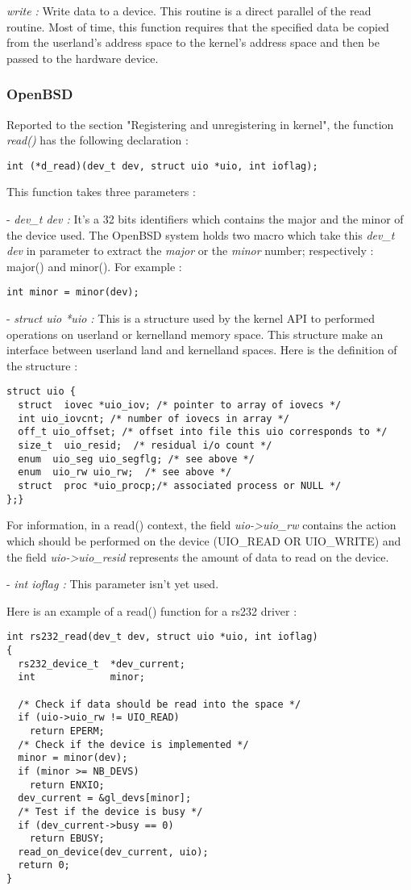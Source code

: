 \documentclass[11pt]{report}
\begin{document}
{\it write :} Write data to a device. This routine is a direct parallel of the read
routine. Most of time, this function requires that the specified data be copied from
the userland's address space to the kernel's address space and then be passed to the
hardware device.

\subsubsection{OpenBSD}
Reported to the section "Registering and unregistering in kernel", the function {\it read()}
has the following declaration :
\begin{lstlisting}
int (*d_read)(dev_t dev, struct uio *uio, int ioflag);
\end{lstlisting}
This function takes three parameters :
\begin{description}
  \item{- {\it dev\_t dev :} It's a 32 bits identifiers which contains the major and the
  minor of the device used. The OpenBSD system holds two macro which take this
  {\it dev\_t dev} in parameter to extract the {\it major} or the {\it minor} number;
  respectively : major() and minor(). For example :
  \begin{lstlisting}
int minor = minor(dev);
  \end{lstlisting}
  }
  \item{- {\it struct uio *uio :} This is a structure used by the kernel API to performed
  operations on userland or kernelland memory space. This structure make an interface
  between userland land and kernelland spaces. Here is the definition of the structure :
  \begin{lstlisting}
struct uio {
  struct  iovec *uio_iov; /* pointer to array of iovecs */
  int uio_iovcnt; /* number of iovecs in array */
  off_t uio_offset; /* offset into file this uio corresponds to */
  size_t  uio_resid;  /* residual i/o count */
  enum  uio_seg uio_segflg; /* see above */
  enum  uio_rw uio_rw;  /* see above */
  struct  proc *uio_procp;/* associated process or NULL */
};}
  \end{lstlisting}
  For information, in a read() context, the field {\it uio-\textgreater uio\_rw} contains
the action which should be performed on the device (UIO\_READ OR UIO\_WRITE) and the field
{\it uio-\textgreater uio\_resid} represents the amount of data to read on the device.}
  \item{- {\it int ioflag :} This parameter isn't yet used.}
\end{description}
Here is an example of a read() function for a rs232 driver :
\begin{lstlisting}
int rs232_read(dev_t dev, struct uio *uio, int ioflag)
{
  rs232_device_t  *dev_current;
  int             minor;

  /* Check if data should be read into the space */
  if (uio->uio_rw != UIO_READ)
    return EPERM;
  /* Check if the device is implemented */
  minor = minor(dev);
  if (minor >= NB_DEVS)
    return ENXIO;
  dev_current = &gl_devs[minor];
  /* Test if the device is busy */
  if (dev_current->busy == 0)
    return EBUSY;
  read_on_device(dev_current, uio);
  return 0;
}
\end{lstlisting}
\end{document}
